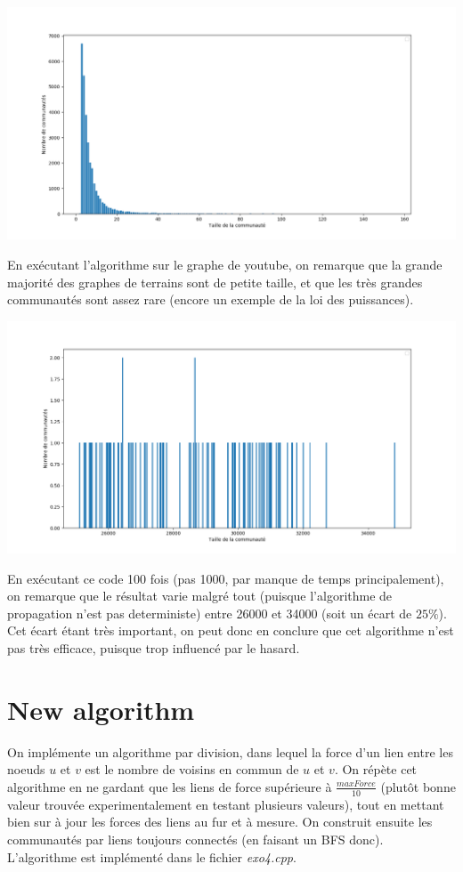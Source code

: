 \documentclass{report}
\begin{document}
\begin{center}
  \includegraphics[width=0.6\paperwidth]{assets/histSizes.png}
\end{center}

En exécutant l'algorithme sur le graphe de youtube, on remarque que la grande majorité des graphes de terrains sont de petite taille, et que les très grandes communautés sont assez rare (encore un exemple de la loi des puissances).\\

\begin{center}
  \includegraphics[width=0.6\paperwidth]{assets/nbComs.png}
\end{center}

En exécutant ce code 100 fois (pas 1000, par manque de temps principalement), on remarque que le résultat varie malgré tout (puisque l'algorithme de propagation n'est pas deterministe) entre 26000 et 34000 (soit un écart de $25\%$). Cet écart étant très important, on peut donc en conclure que cet algorithme n'est pas très efficace, puisque trop influencé par le hasard.

\section{New algorithm}
On implémente un algorithme par division, dans lequel la force d'un lien entre les noeuds $u$ et $v$ est le nombre de voisins en commun de $u$ et $v$. On répète cet algorithme en ne gardant que les liens de force supérieure à $\frac{maxForce}{10}$ (plutôt bonne valeur trouvée experimentalement en testant plusieurs valeurs), tout en mettant bien sur à jour les forces des liens au fur et à mesure. On construit ensuite les communautés par liens toujours connectés (en faisant un BFS donc).\\
L'algorithme est implémenté dans le fichier \textit{exo4.cpp}.
\end{document}
